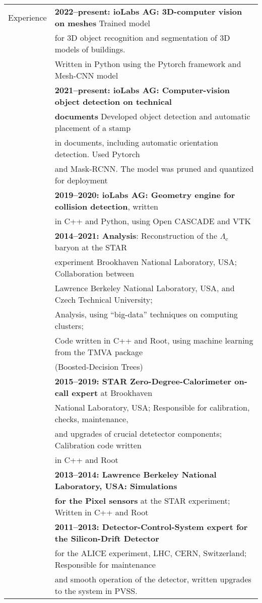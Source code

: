 \documentclass[a4paper,11pt,oneside]{article}
\begin{document}
\begin{tabular}{@{} l l}
  \Large{Experience} & \textbf{2022--present: ioLabs AG: 3D-computer vision on meshes} Trained model \\
     & for 3D object recognition and segmentation of 3D models of buildings. \\
     & Written in Python using the Pytorch framework and Mesh-CNN model\\[.2cm]
     & \textbf{2021--present: ioLabs AG: Computer-vision object detection on technical} \\ 
     & \textbf{documents} Developed object detection and automatic placement of a stamp \\
     & in documents, including automatic orientation detection. Used Pytorch  \\
     & and Mask-RCNN\@. The model was pruned and quantized for deployment\\[.2cm]
     & \textbf{2019--2020: ioLabs AG: Geometry engine for collision detection}, written\\
     &  in C++ and Python, using Open CASCADE and VTK\\[.2cm]
     & \textbf{2014--2021: Analysis}: Reconstruction of the $\Lambda_\mathrm{c}$ baryon  at the STAR \\
     & experiment Brookhaven National Laboratory, USA; Collaboration between \\
     &  Lawrence Berkeley National Laboratory, USA, and Czech Technical University;\\
     & Analysis, using ``big-data'' techniques on computing clusters; \\
     & Code written in C++ and Root, using machine learning from the TMVA package \\
     & (Boosted-Decision Trees)\\[.2cm]
     & \textbf{2015--2019: STAR Zero-Degree-Calorimeter on-call expert} at Brookhaven \\ 
     & National Laboratory, USA\@; Responsible for calibration, checks, maintenance, \\
     & and upgrades of crucial detetector components; Calibration code written \\
     & in C++ and Root \\[.2cm]
     & \textbf{2013--2014: Lawrence Berkeley National Laboratory, USA\@: Simulations } \\ 
     & \textbf{for the Pixel sensors} at the STAR experiment; Written in C++ and Root\\[.2cm]
     & \textbf{2011--2013: Detector-Control-System expert for the Silicon-Drift Detector} \\
     & for the ALICE experiment, LHC, CERN, Switzerland; Responsible for maintenance \\
     & and smooth operation of the detector, written upgrades to the system in PVSS. \\
    

\end{tabular}
\end{document}
